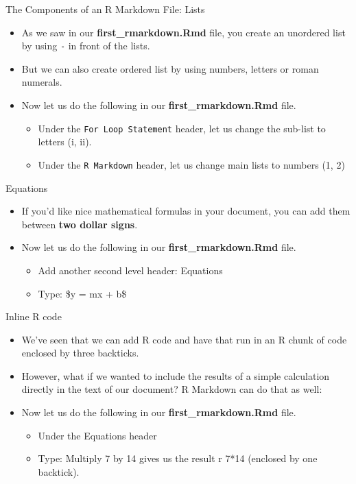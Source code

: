 \documentclass[
  ignorenonframetext,
]{beamer}
\providecommand{\tightlist}{%
  \setlength{\itemsep}{0pt}\setlength{\parskip}{0pt}}
\begin{document}
\begin{frame}[fragile]{The Components of an R Markdown File: Lists}
\protect\hypertarget{the-components-of-an-r-markdown-file-lists}{}
\begin{itemize}
\item
  As we saw in our \textbf{first\_rmarkdown.Rmd} file, you create an
  unordered list by using \texttt{-} in front of the lists.
\item
  But we can also create ordered list by using numbers, letters or roman
  numerals.
\item
  Now let us do the following in our \textbf{first\_rmarkdown.Rmd} file.

  \begin{itemize}
  \tightlist
  \item
    Under the \texttt{For\ Loop\ Statement} header, let us change the
    sub-list to letters (i, ii).
  \item
    Under the \texttt{R\ Markdown} header, let us change main lists to
    numbers (1, 2)
  \end{itemize}
\end{itemize}
\end{frame}

\begin{frame}{Equations}
\protect\hypertarget{equations}{}
\begin{itemize}
\item
  If you'd like nice mathematical formulas in your document, you can add
  them between \textbf{two dollar signs}.
\item
  Now let us do the following in our \textbf{first\_rmarkdown.Rmd} file.

  \begin{itemize}
  \tightlist
  \item
    Add another second level header: Equations
  \item
    Type: \$y = mx + b\$
  \end{itemize}
\end{itemize}
\end{frame}

\begin{frame}{Inline R code}
\protect\hypertarget{inline-r-code}{}
\begin{itemize}
\item
  We've seen that we can add R code and have that run in an R chunk of
  code enclosed by three backticks.
\item
  However, what if we wanted to include the results of a simple
  calculation directly in the text of our document? R Markdown can do
  that as well:
\item
  Now let us do the following in our \textbf{first\_rmarkdown.Rmd} file.

  \begin{itemize}
  \tightlist
  \item
    Under the Equations header
  \item
    Type: Multiply 7 by 14 gives us the result r 7*14 (enclosed by one
    backtick).
  \end{itemize}
\end{itemize}
\end{frame}
\end{document}
